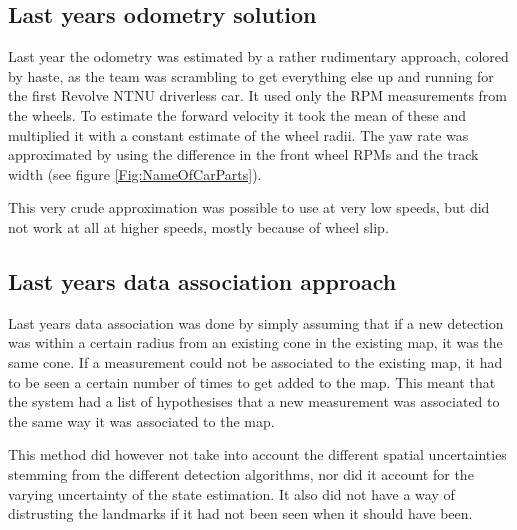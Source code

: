 \subsection{Last years odometry solution}

Last year the odometry was estimated by a rather rudimentary approach, colored by haste, as the team was scrambling to get everything else up and running for the first Revolve NTNU driverless car. It used only the \gls{RPM} measurements from the wheels. To estimate the forward velocity it took the mean of these and multiplied it with a constant estimate of the wheel radii. The yaw rate was approximated by using the difference in the front wheel \glspl{RPM} and the track width (see figure \ref{Fig:NameOfCarParts}).  

This very crude approximation was possible to use at very low speeds, but did not work at all at higher speeds, mostly because of wheel slip. 

\subsection{Last years data association approach}

Last years data association was done by simply assuming that if a new detection was within a certain radius from an existing cone in the existing map, it was the same cone. If a measurement could not be associated to the existing map, it had to be seen a certain number of times to get added to the map. This meant that the system had a list of hypothesises that a new measurement was associated to the same way it was associated to the map. 

This method did however not take into account the different spatial uncertainties stemming from the different detection algorithms, nor did it account for the varying uncertainty of the state estimation. It also did not have a way of distrusting the landmarks if it had not been seen when it should have been. 